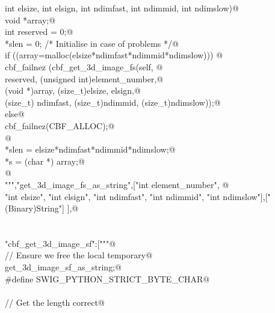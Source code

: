 \documentclass[10pt,a4paper,twoside,notitlepage]{article}
\begin{document}
\begin{flushleft}
\begin{list}{}{}
\mbox{}\verb@    int elsize, int elsign, int ndimfast, int ndimmid, int ndimslow){@\\
\mbox{}\verb@        void *array;@\\
\mbox{}\verb@        int reserved = 0;@\\
\mbox{}\verb@        *slen = 0; /* Initialise in case of problems */@\\
\mbox{}\verb@        if ((array=malloc(elsize*ndimfast*ndimmid*ndimslow))) {@\\
\mbox{}\verb@               cbf_failnez (cbf_get_3d_image_fs(self, @\\
\mbox{}\verb@               reserved, (unsigned int)element_number,@\\
\mbox{}\verb@               (void *)array, (size_t)elsize, elsign,@\\
\mbox{}\verb@               (size_t) ndimfast, (size_t)ndimmid, (size_t)ndimslow));@\\
\mbox{}\verb@         }else{@\\
\mbox{}\verb@               cbf_failnez(CBF_ALLOC);@\\
\mbox{}\verb@         }@\\
\mbox{}\verb@        *slen = elsize*ndimfast*ndimmid*ndimslow;@\\
\mbox{}\verb@        *s = (char *) array;@\\
\mbox{}\verb@      }@\\
\mbox{}\verb@""","get_3d_image_fs_as_string",["int element_number", @\\
\mbox{}\verb@    "int elsize", "int elsign", "int ndimfast", "int ndimmid", "int ndimslow"],["(Binary)String"] ],@\\
\mbox{}\verb@@\\
\mbox{}\verb@@\\
\mbox{}\verb@"cbf_get_3d_image_sf":["""@\\
\mbox{}\verb@// Ensure we free the local temporary@\\
\mbox{}\verb@%cstring_output_allocate_size(char ** s, int *slen, free(*$1))@\\
\mbox{}\verb@       get_3d_image_sf_as_string;@\\
\mbox{}\verb@%{@\\
\mbox{}\verb@#define SWIG_PYTHON_STRICT_BYTE_CHAR@\\
\mbox{}\verb@%}@\\
\mbox{}\verb@@\\
\mbox{}\verb@// Get the length correct@\\
\mbox{}\verb@@\\

\end{list}
\end{flushleft}
\end{document}
